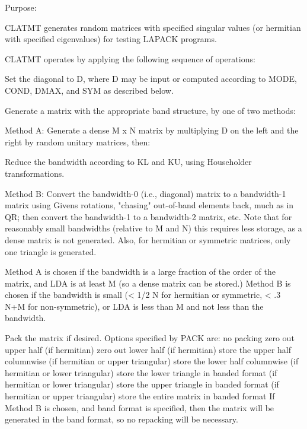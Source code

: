 \begin{DoxyParagraph}{Purpose\+: }
\begin{DoxyVerb}    CLATMT generates random matrices with specified singular values
    (or hermitian with specified eigenvalues)
    for testing LAPACK programs.

    CLATMT operates by applying the following sequence of
    operations:

      Set the diagonal to D, where D may be input or
         computed according to MODE, COND, DMAX, and SYM
         as described below.

      Generate a matrix with the appropriate band structure, by one
         of two methods:

      Method A:
          Generate a dense M x N matrix by multiplying D on the left
              and the right by random unitary matrices, then:

          Reduce the bandwidth according to KL and KU, using
              Householder transformations.

      Method B:
          Convert the bandwidth-0 (i.e., diagonal) matrix to a
              bandwidth-1 matrix using Givens rotations, "chasing"
              out-of-band elements back, much as in QR; then convert
              the bandwidth-1 to a bandwidth-2 matrix, etc.  Note
              that for reasonably small bandwidths (relative to M and
              N) this requires less storage, as a dense matrix is not
              generated.  Also, for hermitian or symmetric matrices,
              only one triangle is generated.

      Method A is chosen if the bandwidth is a large fraction of the
          order of the matrix, and LDA is at least M (so a dense
          matrix can be stored.)  Method B is chosen if the bandwidth
          is small (< 1/2 N for hermitian or symmetric, < .3 N+M for
          non-symmetric), or LDA is less than M and not less than the
          bandwidth.

      Pack the matrix if desired. Options specified by PACK are:
         no packing
         zero out upper half (if hermitian)
         zero out lower half (if hermitian)
         store the upper half columnwise (if hermitian or upper
               triangular)
         store the lower half columnwise (if hermitian or lower
               triangular)
         store the lower triangle in banded format (if hermitian or
               lower triangular)
         store the upper triangle in banded format (if hermitian or
               upper triangular)
         store the entire matrix in banded format
      If Method B is chosen, and band format is specified, then the
         matrix will be generated in the band format, so no repacking
         will be necessary.\end{DoxyVerb}
 
\end{DoxyParagraph}

